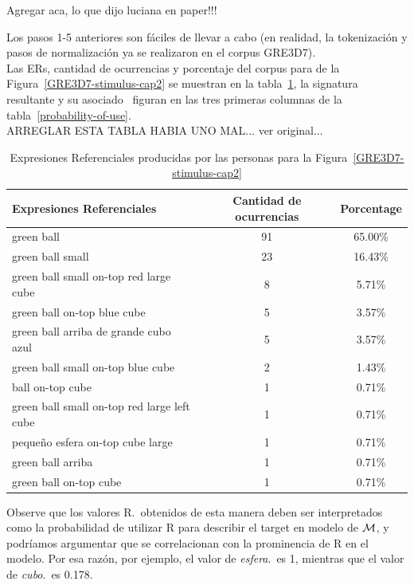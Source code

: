 Agregar aca, lo que dijo luciana en paper!!!


Los pasos 1-5 anteriores son f\'aciles de llevar a cabo (en realidad, la tokenizaci\'on y
pasos de normalizaci\'on ya se realizaron en el corpus GRE3D7). \\
Las ERs, cantidad de ocurrencias y porcentaje del corpus para de la Figura~\ref{GRE3D7-stimulus-cap2} se muestran en la tabla~\ref{corpus-distribution}, la signatura resultante y su asociado \puse\ figuran en las tres primeras columnas de la tabla~\ref{probability-of-use}.\\

ARREGLAR ESTA TABLA HABIA UNO MAL... ver original...
\begin{table}[h!]
\begin{center}
\begin{tabular}{|l|c|c|}
\hline
Expresiones Referenciales & Cantidad de ocurrencias & Porcentage \\
\hline

green ball & 91 & 65.00\% \\
green ball small  & 23 & 16.43\% \\
green ball small on-top red large cube & 8 & 5.71\% \\
green ball on-top blue cube & 5 & 3.57\% \\
green ball arriba de grande cubo azul & 5 & 3.57\% \\
green ball small on-top blue cube & 2 & 1.43\% \\
ball on-top cube & 1 & 0.71\% \\
green ball small on-top red large left cube  & 1 & 0.71\% \\
peque\~no esfera on-top cube large & 1 & 0.71\% \\
green ball arriba & 1 & 0.71\% \\
green ball on-top cube & 1 & 0.71\% \\

\hline
\end{tabular}
\caption{Expresiones Referenciales producidas por las personas para la Figura~\ref{GRE3D7-stimulus-cap2}}\label{corpus-distribution}
\end{center}
\end{table}


Observe que los valores R.\puse\ obtenidos de esta manera deben ser
interpretados como la probabilidad de utilizar R para describir el target en
modelo de $\mathcal{M} $, y podr\'{i}amos argumentar que se correlacionan con la
 prominencia de R en el modelo. Por esa raz\'on, por ejemplo, el
valor de \emph{esfera}.\puse\ es 1, mientras que el valor de
\emph{cubo}.\puse\ es 0.178. \\

